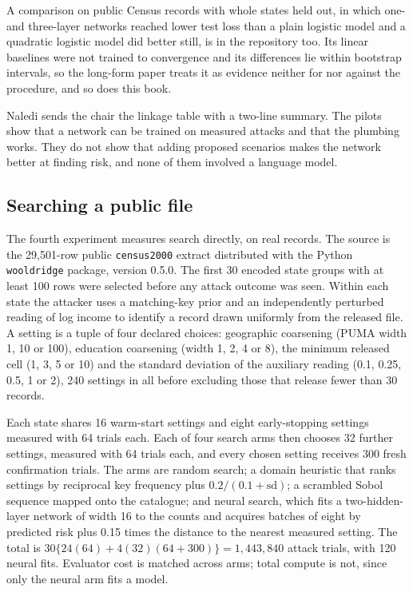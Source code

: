 A comparison on public Census records with whole states held out, in which one- and
three-layer networks reached lower test loss than a plain logistic model and a
quadratic logistic model did better still, is in the repository too. Its linear
baselines were not trained to convergence and its differences lie within bootstrap
intervals, so the long-form paper treats it as evidence neither for nor against the
procedure, and so does this book.

Naledi sends the chair the linkage table with a two-line summary. The pilots show that
a network can be trained on measured attacks and that the plumbing works. They do not
show that adding proposed scenarios makes the network better at finding risk, and
none of them involved a language model.

\subsection{Searching a public file}\label{c14:sec-public}

The fourth experiment measures search directly, on real records. The source is the
29{,}501-row public \texttt{census2000} extract distributed with the Python
\texttt{wooldridge} package, version 0.5.0. The first 30 encoded state groups with at
least 100 rows were selected before any attack outcome was seen. Within each state the
attacker uses a matching-key prior and an independently perturbed reading of log
income to identify a record drawn uniformly from the released file.
A setting is a tuple of four declared choices: geographic coarsening (PUMA width 1, 10
or 100), education coarsening (width 1, 2, 4 or 8), the minimum released cell (1, 3, 5
or 10) and the standard deviation of the auxiliary reading (0.1, 0.25, 0.5, 1 or 2),
240 settings in all before excluding those that release fewer than 30 records.

Each state shares 16 warm-start settings and eight early-stopping settings measured
with 64 trials each. Each of four search arms then chooses 32 further settings,
measured with 64 trials each, and every chosen setting receives 300 fresh confirmation
trials. The arms are random search; a domain heuristic that ranks settings by
reciprocal key frequency plus $0.2/(0.1+\text{sd})$; a scrambled Sobol sequence mapped
onto the catalogue; and neural search, which fits a two-hidden-layer network of width
16 to the counts and acquires batches of eight by predicted risk plus 0.15 times the
distance to the nearest measured setting. The total is
$30\{24(64) + 4(32)(64+300)\} = 1{,}443{,}840$ attack trials, with 120 neural fits.
Evaluator cost is matched across arms; total compute is not, since only the neural arm
fits a model.

